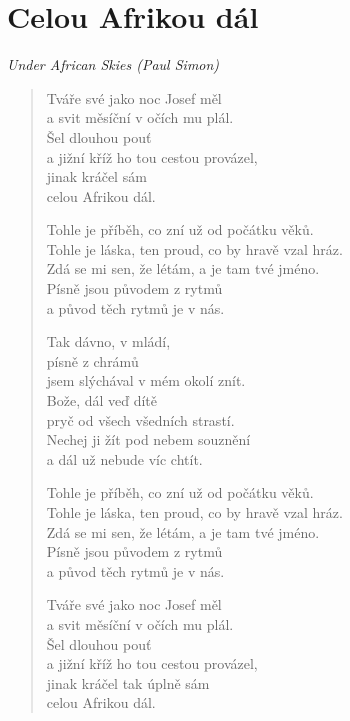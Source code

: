 \section*{Celou Afrikou dál}

\textit{Under African Skies (Paul Simon)}

\begin{verse}
Tváře své jako noc Josef měl \\
a svit měsíční v očích mu plál. \\
Šel dlouhou pouť \\
a jižní kříž ho tou cestou provázel, \\
jinak kráčel sám \\
celou Afrikou dál.

Tohle je příběh, co zní už od počátku věků. \\
Tohle je láska, ten proud, co by hravě vzal hráz. \\
Zdá se mi sen, že létám, a je tam tvé jméno. \\
Písně jsou původem z rytmů \\
a původ těch rytmů je v nás.

Tak dávno, v mládí, \\
písně z chrámů \\
jsem slýchával v mém okolí znít. \\
Bože, dál veď dítě \\
pryč od všech všedních strastí. \\
Nechej ji žít pod nebem souznění \\
a dál už nebude víc chtít.

Tohle je příběh, co zní už od počátku věků. \\
Tohle je láska, ten proud, co by hravě vzal hráz. \\
Zdá se mi sen, že létám, a je tam tvé jméno. \\
Písně jsou původem z rytmů \\
a původ těch rytmů je v nás.

Tváře své jako noc Josef měl \\
a svit měsíční v očích mu plál. \\
Šel dlouhou pouť \\
a jižní kříž ho tou cestou provázel, \\
jinak kráčel tak úplně sám \\
celou Afrikou dál.
\end{verse}
